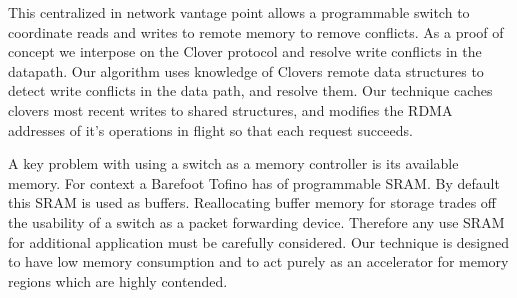 This centralized in network vantage point allows a programmable switch
to coordinate reads and writes to remote memory to remove conflicts.
As a proof of concept we interpose on the Clover protocol and resolve
write conflicts in the datapath. Our algorithm uses knowledge of
Clovers remote data structures to detect write conflicts in the data
path, and resolve them. Our technique caches clovers most recent
writes to shared structures, and modifies the RDMA addresses of it's
operations in flight so that each request succeeds. 

A key problem with using a switch as a memory controller is its
available memory. For context a Barefoot Tofino has  of
programmable SRAM. By default this SRAM is used as buffers.
Reallocating buffer memory for storage trades off the usability of a
switch as a packet forwarding device. Therefore any use SRAM for
additional application must be carefully considered. 
Our technique is designed to have low memory consumption and to act
purely as an accelerator for memory regions which are highly
contended. 





